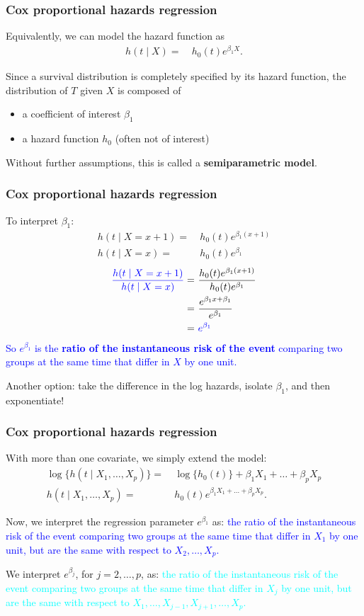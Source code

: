 \documentclass[12pt, 
hyperref={colorlinks=true, linkcolor=blue, urlcolor=cyan},dvipsnames]{beamer}
\begin{document}
\begin{frame}
\frametitle{Cox proportional hazards regression}
Equivalently, we can model the hazard function as
\begin{align*}
h(t \mid X) = & \ h_0(t)e^{\beta_1 X}.
\end{align*}

Since a survival distribution is completely specified by its hazard function, the distribution of $T$ given $X$ is composed of
\begin{itemize}
\item a coefficient of interest $\beta_1$ 
\item a hazard function $h_0$ (often not of interest)
\end{itemize}
Without further assumptions, this is called a \textbf{semiparametric model}.
\end{frame}

\begin{frame}
\frametitle{Cox proportional hazards regression}
To interpret $\beta_1$: 
\begin{align*}
h(t \mid X = x + 1) = & \ h_0(t)e^{\beta_1 (x + 1)}\\
h(t \mid X = x) = & \ h_0(t)e^{\beta_1} 
\end{align*}\pause \vspace{-0.3cm}
\begin{align*}
\textcolor{blue}{\frac{h(t \mid X = x + 1)}{h(t \mid X = x)}} = & \ \frac{h_0(t)e^{\beta_1 (x + 1)}}{h_0(t)e^{\beta_1}} \\
=& \ \frac{e^{\beta_1x + \beta_1}}{e^{\beta_1}} \\
=& \ \textcolor{blue}{e^{\beta_1}}
\end{align*}
\textcolor{blue}{So $e^{\beta_1}$ is the \textbf{ratio of the instantaneous risk of the event} comparing two groups at the same time that differ in $X$ by one unit.}

Another option: take the difference in the log hazards, isolate $\beta_1$, and then exponentiate!
\end{frame}

\begin{frame}
\frametitle{Cox proportional hazards regression}
With more than one covariate, we simply extend the model:
\begin{align*}
\log \{h(t \mid X_1, \dots, X_p)\} = & \ \log\{h_0(t)\} + \beta_1 X_1 + \dots + \beta_pX_p \\
h(t \mid X_1, \dots, X_p) = & \ h_0(t)e^{\beta_1X_1 + \dots + \beta_pX_p}.
\end{align*}

Now, we interpret the regression parameter $e^{\beta_1}$ as: \pause \textcolor{blue}{the ratio of the instantaneous risk of the event comparing two groups at the same time that differ in $X_1$ by one unit, but are the same with respect to $X_2, \dots, X_p$.}

We interpret $e^{\beta_j}$, for $j = 2, \dots, p$, as: \pause
\textcolor{cyan}{the ratio of the instantaneous risk of the event comparing two groups at the same time that differ in $X_j$ by one unit, but are the same with respect to $X_1, \dots, X_{j-1}, X_{j+1}, \dots, X_p$.}
\end{frame}
\end{document}
